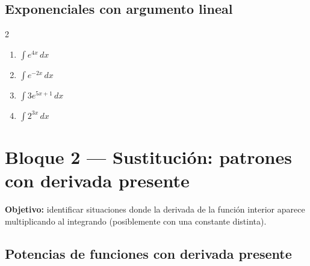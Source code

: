 \documentclass[12pt, letterpaper]{article}
\newcommand{\dx}{\,dx}
\begin{document}
\subsection{Exponenciales con argumento lineal}

\begin{multicols}{2}
\begin{enumerate}[label=\textbf{\arabic*.}, leftmargin=*, itemsep=10pt, start=13]

  \item \facil\quad $\displaystyle\int e^{4x}\dx$

  \item \facil\quad $\displaystyle\int e^{-2x}\dx$

  \item \medio\quad $\displaystyle\int 3e^{5x+1}\dx$

  \item \medio\quad $\displaystyle\int 2^{3x}\dx$

\end{enumerate}
\end{multicols}

\vspace{4pt}

\section{Bloque 2 — Sustitución: patrones con derivada presente}

\begin{cuadroinfo}
\small\textbf{Objetivo:} identificar situaciones donde la derivada de la función
interior aparece multiplicando al integrando (posiblemente con una constante distinta).
\end{cuadroinfo}

\vspace{4pt}

\subsection{Potencias de funciones con derivada presente}
\end{document}
